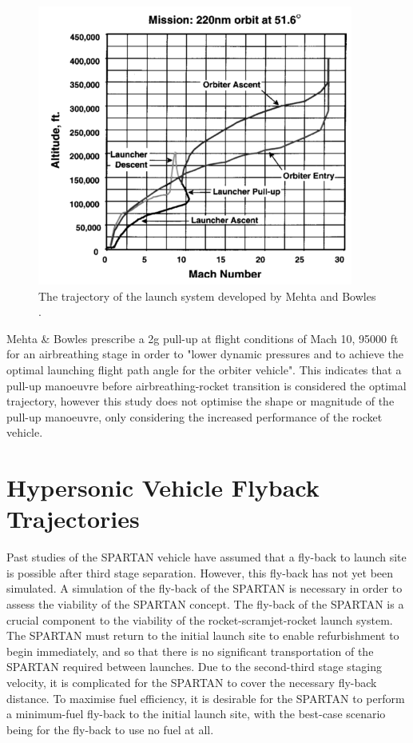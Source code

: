 \begin{figure}
\begin{minipage}[b]{0.6\textwidth}
		\includegraphics[width=\linewidth]{"figures/2_literature-review/Mehta Trajectory"}
		\caption{The trajectory of the launch system developed by Mehta and Bowles \cite{Mehta2001}.}
		\label{fig:MehtaTrajectory}
	\end{minipage}
	
\end{figure}
Mehta \& Bowles \cite{Mehta2001} prescribe a 2g pull-up at flight conditions of Mach 10, 95000 ft for an airbreathing stage in order to "lower dynamic pressures and to achieve the optimal launching flight path angle for the orbiter vehicle". This indicates that a pull-up manoeuvre before airbreathing-rocket transition is considered the optimal trajectory, however this study does not optimise the shape or magnitude of the pull-up manoeuvre, only considering the increased performance of the rocket vehicle. 



\section{Hypersonic Vehicle Flyback Trajectories}

Past studies of the SPARTAN vehicle have assumed that a fly-back to launch site is possible after third stage separation\cite{Preller2017}. However, this fly-back has not yet been simulated. A simulation of the fly-back of the SPARTAN is necessary in order to assess the viability of the SPARTAN concept.
The fly-back of the SPARTAN is a crucial component to the viability of the rocket-scramjet-rocket launch system. The SPARTAN must return to the initial launch site to enable refurbishment to begin immediately, and so that there is no significant transportation of the SPARTAN required between launches. 
Due to the second-third stage staging velocity, it is complicated for the SPARTAN to cover the necessary fly-back distance. 
To maximise fuel efficiency, it is desirable for the SPARTAN to perform a minimum-fuel fly-back to the initial launch site, with the best-case scenario being for the fly-back to use no fuel at all.

